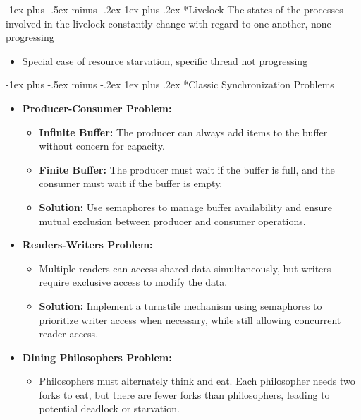 \documentclass[10pt,landscape]{article}
\makeatletter
\renewcommand{\subsubsection}{\@startsection{subsubsection}{3}{0mm}%
                                {-1ex plus -.5ex minus -.2ex}%
                                {1ex plus .2ex}%
                                {\normalfont\small\bfseries}}
\newcommand{\subsubsubsection}{\@startsection{subsubsection}{3}{0mm}%
                                {-1ex plus -.5ex minus -.2ex}%
                                {1ex plus .2ex}%
                                {\normalfont\scriptsize\bfseries}}
\makeatother
\begin{document}
\begin{multicols*}{3}
\subsubsection*{Livelock}
The states of the processes involved in the livelock constantly change with regard to one another, none progressing
\begin{itemize}[topsep=0pt,noitemsep,wide=0pt, leftmargin=\dimexpr{} + 2\relax]
    \item Special case of resource starvation, specific thread not progressing
\end{itemize}

\subsubsubsection*{Classic Synchronization Problems}
\begin{itemize}[topsep=0pt,noitemsep,wide=0pt, leftmargin=\dimexpr{} + 2\relax]
    \item \textbf{Producer-Consumer Problem:}
    \begin{itemize}[topsep=0pt,noitemsep,wide=0pt, leftmargin=\dimexpr{} + 2\relax]
        \item \textbf{Infinite Buffer:} The producer can always add items to the buffer without concern for capacity.
        \item \textbf{Finite Buffer:} The producer must wait if the buffer is full, and the consumer must wait if the buffer is empty.
        \item \textbf{Solution:} Use semaphores to manage buffer availability and ensure mutual exclusion between producer and consumer operations.
    \end{itemize}
    \item \textbf{Readers-Writers Problem:}
    \begin{itemize}[topsep=0pt,noitemsep,wide=0pt, leftmargin=\dimexpr{} + 2\relax]
        \item Multiple readers can access shared data simultaneously, but writers require exclusive access to modify the data.
        \item \textbf{Solution:} Implement a turnstile mechanism using semaphores to prioritize writer access when necessary, while still allowing concurrent reader access.
    \end{itemize}
    \item \textbf{Dining Philosophers Problem:}
    \begin{itemize}[topsep=0pt,noitemsep,wide=0pt, leftmargin=\dimexpr{} + 2\relax]
        \item Philosophers must alternately think and eat. Each philosopher needs two forks to eat, but there are fewer forks than philosophers, leading to potential deadlock or starvation.
    \end{itemize}
\end{itemize}


\end{multicols*}
\end{document}
